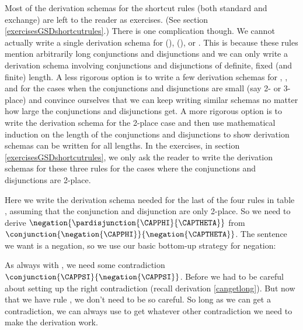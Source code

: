Most of the derivation schemas for the shortcut rules (both standard and exchange) are left to the reader as exercises. 
(See section \ref{exercisesGSDshortcutrules}.) 
There is one complication though. 
We cannot actually write a single derivation schema for  (),  (), or . 
This is because these rules mention arbitrarily long conjunctions and disjunctions and we can only write a derivation schema involving conjunctions and disjunctions of definite, fixed (and finite) length. 
A less rigorous option is to write a few derivation schemas for , , and  for the cases when the conjunctions and disjunctions are small (say 2- or 3-place) and convince ourselves that we can keep writing similar schemas no matter how large the conjunctions and disjunctions get.
A more rigorous option is to write the derivation schema for the 2-place case and then use mathematical induction on the length of the conjunctions and disjunctions to show derivation schemas can be written for all lengths. 
In the exercises, in section \ref{exercisesGSDshortcutrules}, we only ask the reader to write the derivation schemas for these three rules for the cases where the conjunctions and disjunctions are 2-place.

Here we write the derivation schema needed for the last of the four  rules in table , assuming that the conjunction and disjunction are only 2-place.
So we need to derive $\negation{\pardisjunction{\CAPPHI}{\CAPTHETA}}$ from $\conjunction{\negation{\CAPPHI}}{\negation{\CAPTHETA}}$. 
The sentence we want is a negation, so we use our basic bottom-up strategy for negation:
\begin{gproof}
\end{gproof}
\noindent{}As always with , we need some contradiction $\conjunction{\CAPPSI}{\negation{\CAPPSI}}$. 
Before we had to be careful about setting up the right contradiction (recall derivation \ref{cangetlong}). %
But now that we have rule , we don't need to be so careful. 
So long as we can get a contradiction, we can always use  to get whatever other contradiction we need to make the derivation work.
 
